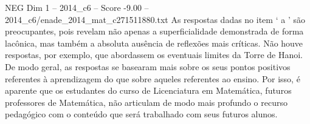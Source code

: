 \begin{textsample}{NEG Dim 1 – 2014\_c6 – Score -9.00 – 2014\_c6/enade\_2014\_mat\_c271511880.txt}
As respostas dadas no item ‘ a ’ são preocupantes, pois revelam não apenas a superficialidade demonstrada de forma lacônica, mas também a absoluta ausência de reflexões mais críticas.
Não houve respostas, por exemplo, que abordassem os eventuais limites da Torre de Hanoi.
De modo geral, as respostas se basearam mais sobre os seus pontos positivos referentes à aprendizagem do que sobre aqueles referentes ao ensino.
Por isso, é aparente que os estudantes do curso de Licenciatura em Matemática, futuros professores de Matemática, não articulam de modo mais profundo o recurso pedagógico com o conteúdo que será trabalhado com seus futuros alunos.

\end{textsample}
